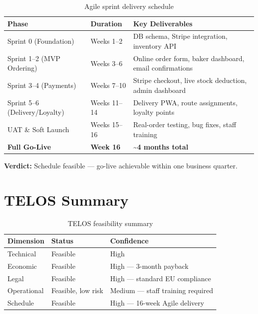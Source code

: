 \documentclass[12pt, a4paper]{report}
\begin{document}
\begin{table}[H]
  \centering
  \begin{tabularx}{\textwidth}{L{5cm} L{2.5cm} X}
    \toprule
    \textbf{Phase} & \textbf{Duration} & \textbf{Key Deliverables} \\
    \midrule
    Sprint 0 (Foundation)          & Weeks 1--2  & DB schema, Stripe integration, inventory API \\
    Sprint 1--2 (MVP Ordering)     & Weeks 3--6  & Online order form, baker dashboard, email confirmations \\
    Sprint 3--4 (Payments)         & Weeks 7--10 & Stripe checkout, live stock deduction, admin dashboard \\
    Sprint 5--6 (Delivery/Loyalty) & Weeks 11--14& Delivery PWA, route assignments, loyalty points \\
    UAT \& Soft Launch             & Weeks 15--16& Real-order testing, bug fixes, staff training \\
    \textbf{Full Go-Live}          & \textbf{Week 16} & \textbf{\textasciitilde4 months total} \\
    \bottomrule
  \end{tabularx}
  \caption{Agile sprint delivery schedule}
\end{table}

\begin{verdictbox}
\textbf{Verdict:} Schedule feasible --- go-live achievable within one business
quarter.
\end{verdictbox}

\section{TELOS Summary}

\begin{table}[H]
  \centering
  \begin{tabularx}{\textwidth}{L{2.5cm} L{3.5cm} X}
    \toprule
    \textbf{Dimension} & \textbf{Status} & \textbf{Confidence} \\
    \midrule
    Technical    & Feasible           & High \\
    Economic     & Feasible           & High --- 3-month payback \\
    Legal        & Feasible           & High --- standard EU compliance \\
    Operational  & Feasible, low risk & Medium --- staff training required \\
    Schedule     & Feasible           & High --- 16-week Agile delivery \\
    \bottomrule
  \end{tabularx}
  \caption{TELOS feasibility summary}
\end{table}
\end{document}
